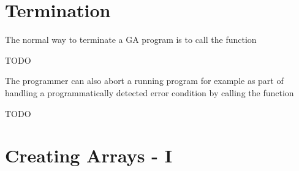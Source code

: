 \section{Termination}

The normal way to terminate a GA program is to call the function

TODO

The programmer can also abort a running program for example as part
of handling a programmatically detected error condition by calling
the function

TODO

\section{Creating Arrays - I}

